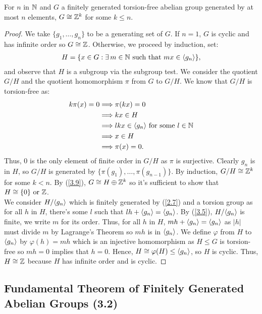 For $n$ in $\mathbb{N}$ and $G$ a finitely generated torsion-free abelian group
generated by at most $n$ elements, $G \cong \mathbb{Z}^k$ for some $k \leq n$.

\begin{proof}
    We take $\{g_1, \ldots, g_n\}$ to be a generating set of $G$. If
    $n = 1$, $G$ is cyclic and has infinite order so $G \cong \mathbb{Z}$.
    Otherwise, we proceed by induction, set: \begin{align*}
        H = \{x \in G : \exists \, m \in \mathbb{N} \text{ such that } mx \in {\langle g_n \rangle} \},     
    \end{align*} and observe that $H$ is a subgroup via the subgroup test. We 
    consider the quotient $G / H$ and the quotient homomorphism $\pi$ from $G$ to $G / H$.
    We know that $G / H$ is torsion-free as: \begin{align*}
        k\pi(x) = 0 
        &\Longrightarrow \pi(kx) = 0 \\
        &\Longrightarrow kx \in H \\
        &\Longrightarrow lkx \in {\langle g_n \rangle} \text{ for some } l \in \mathbb{N} \\
        &\Longrightarrow x \in H \\
        &\Longrightarrow \pi(x) = 0.
    \end{align*} Thus, $0$ is the only element of finite order in $G / H$
    as $\pi$ is surjective. Clearly $g_n$ is in $H$, so $G / H$
    is generated by $\{\pi(g_1), \ldots, \pi(g_{n - 1})\}$.
    By induction, $G / H \cong \mathbb{Z}^k$ for some $k < n$.
    By (\ref{3.9}), $G \cong H \oplus \mathbb{Z}^k$ so it's sufficient
    to show that $H \cong \{0\} \text{ or } \mathbb{Z}$. 
    \\[\baselineskip]
    We consider $H / {\langle g_n \rangle}$ which is finitely generated by (\ref{2.7}) 
    and a torsion group as for all $h$ in $H$, there's some $l$ such that 
    $lh + {\langle g_n \rangle} = {\langle g_n \rangle}$.
    By (\ref{3.5}), $H / {\langle g_n \rangle}$ is finite, we write $m$ for its order.
    Thus, for all $h$ in $H$, $mh + {\langle g_n \rangle} = {\langle g_n \rangle}$ as $|h|$ must divide $m$
    by Lagrange's Theorem so $mh$ is in ${\langle g_n \rangle}$. We define $\varphi$ from $H$ to 
    ${\langle g_n \rangle}$ by $\varphi(h) = mh$ which is an injective homomorphism as 
    $H \leq G$ is torsion-free so $mh = 0$ implies that $h = 0$.
    Hence, $H \cong \varphi(H) \leq {\langle g_n \rangle}$, so $H$ is cyclic.
    Thus, $H \cong \mathbb{Z}$ because $H$ has infinite order and is cyclic.
\end{proof}

\subsection{Fundamental Theorem of Finitely Generated Abelian Groups (3.2)} \label{3.2}

